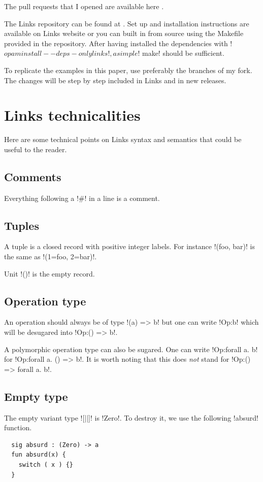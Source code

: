\documentclass[11pt, nonacm=true, language=french, language=english]{acmart}
\begin{document}
The pull requests that I opened are available here \cite{gh:prs}.

The Links repository can be found at \cite{gh:links}. Set up and installation instructions are available on Links website \cite{links-org} or you can built in from source using the Makefile provided in the repository. After having installed the dependencies with !$ opam install --deps-only links!, a simple !$ make! should be sufficient.

To replicate the examples in this paper, use preferably the branches of my fork. The changes will be step by step included in Links and in new releases.


\section{Links technicalities}
\label{sec:tech}

Here are some technical points on Links syntax and semantics that could be useful to the reader.

\subsection{Comments}
\label{sec:comments}
Everything following a !#! in a line is a comment.

\subsection{Tuples}
\label{sec:tuples}
A tuple is a closed record with positive integer labels. For instance !(foo, bar)! is the same as !(1=foo, 2=bar)!.

Unit !()! is the empty record.


\subsection{Operation type}
\label{sec:operation-type}
An operation should always be of type !(a) => b! but one can write !Op:b! which will be desugared into !Op:() => b!.

A polymorphic operation type can also be sugared. One can write !Op:forall a. b! for !Op:forall a. () => b!. It is worth noting that this does \emph{not} stand for !Op:() => forall a. b!.

\subsection{Empty type}
\label{sec:tech:zero}
The empty variant type ![||]! is !Zero!. To destroy it, we use the following !absurd! function.
\begin{lstlisting}
  sig absurd : (Zero) -> a
  fun absurd(x) {
    switch ( x ) {}
  }
\end{lstlisting}
\end{document}

